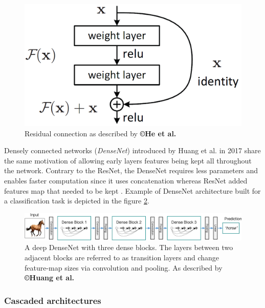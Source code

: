 \begin{figure}[th!]
	\centering
	\includegraphics[width=0.4\linewidth]{images/He2015_Fig2}
	\caption{Residual connection as described by \textbf{©He et al. \cite{He2015}}}
	\label{ResidualConnection_Fig}
\end{figure}

Densely connected networks (\emph{DenseNet}) introduced by Huang
et al. \cite{Huang2017} in 2017 share the same motivation of allowing early layers
features being kept all throughout the network. Contrary to the ResNet,
the DenseNet requires less parameters and enables faster computation
since it uses concatenation whereas ResNet added features map that
needed to be kept \cite{Huang2017}. Example of DenseNet
architecture built for a classification task is depicted in the figure \ref{DenseNet_Fig}.
\begin{figure}[th!]
	\centering
	\includegraphics[width=0.9\linewidth]{images/Huang2017_Fig2}
	\caption{A deep DenseNet with three dense blocks. The layers between two adjacent blocks are referred to as transition layers and change feature-map sizes via convolution and pooling. As described by \textbf{©Huang et al. \cite{Huang2017}}}
	\label{DenseNet_Fig}
\end{figure}


\subsubsection{Cascaded architectures}

